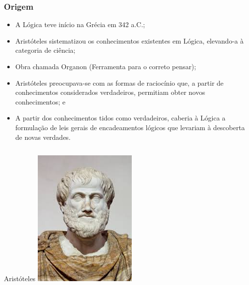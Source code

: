 \documentclass{beamer}
\begin{document}
\begin{frame}
\frametitle{Origem}

\begin{itemize}
	\item A Lógica teve início na Grécia em 342 a.C.;
	\item Aristóteles sistematizou os conhecimentos existentes em Lógica, elevando-a à categoria de ciência;
	\item Obra chamada Organon (Ferramenta para o correto pensar);
	\item Aristóteles preocupava-se com as formas de raciocínio que, a partir de conhecimentos considerados verdadeiros, permitiam obter novos conhecimentos; e
	\item A partir dos conhecimentos tidos como verdadeiros, caberia à Lógica a formulação de leis gerais de encadeamentos lógicos que levariam à descoberta de novas verdades.
\end{itemize}\vfill

\begin{columns}[c] 
	\begin{exampleblock}{Aristóteles}
		\center
		\includegraphics[scale=0.18]{img/aristoteles}
	\end{exampleblock}
	

\end{columns}
\end{frame}
\end{document}
